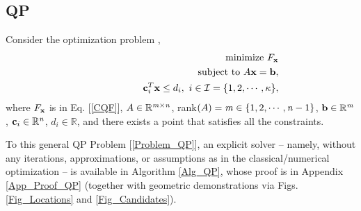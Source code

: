 \documentclass[9pt,twocolumn,twoside,lineno]{pnas-new-1}
\newcommand{\beq}{\begin{eqnarray}}
\newcommand{\eeq}{\end{eqnarray}}
\newcommand{\bfb}{{\bf b}}
\newcommand{\bfc}{{\bf c}}
\newcommand{\bfx}{{\bf x}}
\newcommand{\real}{\mathbb{R}}
\newcommand{\calI}{{\mathcal I}}
\newcommand{\itm}{{\it m}}
\newcommand{\itn}{{\it n}}
\theoremstyle{remark}
\begin{document}
\subsection{QP}
\label{Subsec_QP}
Consider the optimization problem \citep{Lu(Ye):03(16)},
\beq
&&\mbox{minimize}~F_\bfx\nonumber\\
&&\mbox{subject to}~A\bfx=\bfb,\nonumber\\
&&\hspace{1.84cm}\bfc_i^T\bfx\le d_i,~i\in\calI=\{1,2,\cdots,\kappa\},
\label{Problem_QP}
\eeq
where $F_\bfx$ is in Eq. [\ref{CQF}], $A\in\real^{\itm\times\itn}$, rank$(A)=\itm\in\{1,2,\cdots,\itn-1\}$, $\bfb\in\real^\itm$, $\bfc_i\in\real^\itn$, $d_i\in\real$, and there exists a point that satisfies all the constraints.

To this general QP Problem [\ref{Problem_QP}], an explicit solver -- namely, without any iterations, approximations, or assumptions as in the classical/numerical optimization \citep{Lu(Ye):03(16),NoWr:06} -- is available in Algorithm \ref{Alg_QP}, whose proof is in Appendix \ref{App_Proof_QP} (together with geometric demonstrations via Figs. \ref{Fig_Locations} and \ref{Fig_Candidates}).
\end{document}
